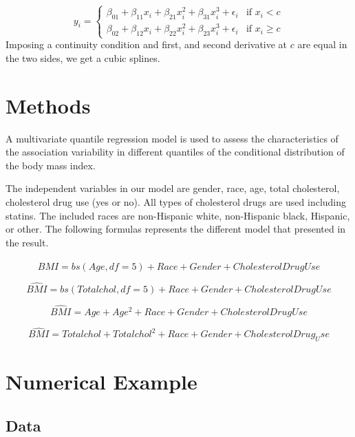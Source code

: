 \documentclass[
  12pt,
]{article}
\begin{document}
\begin{equation}
y_{i}=
 \left\{
\begin{array}{ll}
 \beta_{01}+\beta_{11}x_i+\beta_{21}x_i^2+ \beta_{31}x_i^3+ \epsilon_i & \mbox{if } x_i< c \\
 \beta_{02}+\beta_{12}x_i+\beta_{22}x_i^2+ \beta_{23}x_i^3+ \epsilon_i& \mbox{if } x_i \geq c
\end{array}
\right.
\end{equation}
Imposing a continuity condition and first, and second derivative at \(c\) are equal in the two sides, we get a cubic splines.

\section{Methods}

A multivariate quantile regression model is used to assess the characteristics of the association variability in different quantiles of the conditional distribution of the body mass index.

The independent variables in our model are gender, race, age, total cholesterol, cholesterol drug use (yes or no). All types of cholesterol drugs are used including statins. The included races are non-Hispanic white, non-Hispanic black, Hispanic, or other. The following formulas represents the different model that presented in the result.

\begin{equation}
 \hat{BMI}= bs(Age, df = 5) + Race + Gender + Cholesterol Drug Use
 \end{equation}

\begin{equation}
 \hat{BMI}= bs(Total chol, df=5)+ Race + Gender + Cholesterol Drug Use
 \end{equation}

\begin{equation}
 \hat{BMI}= Age+Age^2+ Race + Gender + Cholesterol Drug Use 
 \end{equation}

\begin{equation}
 \hat{BMI}= Total chol+ Total chol^2+ Race + Gender + Cholesterol Drug_Use
 \end{equation}

\section{Numerical Example}
\subsection{Data}
\end{document}
